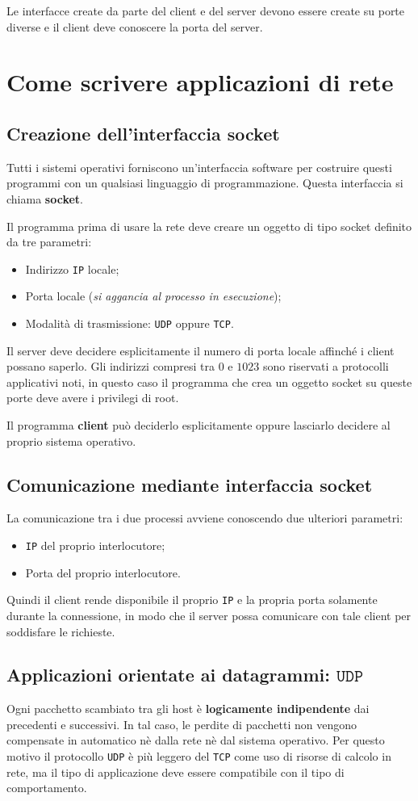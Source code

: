 \documentclass[oneside,a4paper,11pt]{book}
\theoremstyle{italicstyle}
\theoremstyle{normStyle}
\begin{document}
Le interfacce create da parte del client e del server devono essere 
create su porte diverse e il client deve conoscere la porta del server.
\section{Come scrivere applicazioni di rete}
\subsection{Creazione dell'interfaccia socket}
Tutti i sistemi operativi forniscono un'interfaccia software per 
costruire questi programmi con un qualsiasi linguaggio di programmazione.
Questa interfaccia si chiama \textbf{socket}.

Il programma prima di usare la rete deve creare un oggetto di tipo socket definito 
da tre parametri:
\begin{itemize}
  \item Indirizzo \verb|IP| locale;
  \item Porta locale (\textit{si aggancia al processo in esecuzione});
  \item Modalità di trasmissione: \verb|UDP| oppure \verb|TCP|.
\end{itemize}

Il server deve decidere esplicitamente il numero di porta locale affinché i 
client possano saperlo. Gli indirizzi compresi tra $0$ e $1023$ sono riservati 
a protocolli applicativi noti, in questo caso il programma che crea un oggetto 
socket su queste porte deve avere i privilegi di root.

Il programma \textbf{client} può deciderlo esplicitamente oppure lasciarlo decidere 
al proprio sistema operativo.
\subsection{Comunicazione mediante interfaccia socket}
La comunicazione tra i due processi avviene conoscendo due ulteriori parametri:
\begin{itemize}  
  \item \verb|IP| del proprio interlocutore;
  \item Porta del proprio interlocutore.
\end{itemize}
Quindi il client rende disponibile il proprio \verb|IP| e la propria 
porta solamente 
durante la connessione, in modo che il server possa comunicare con 
tale client per soddisfare le richieste.
\subsection{Applicazioni orientate ai datagrammi: $\texttt{UDP}$}
Ogni pacchetto scambiato tra gli host è \textbf{logicamente indipendente}
dai precedenti e successivi.
In tal caso, le perdite di pacchetti non vengono compensate in automatico 
nè dalla rete nè dal sistema operativo. Per questo motivo il protocollo \verb|UDP|
è più leggero del \verb|TCP| come uso di risorse di calcolo in rete, ma 
il tipo di applicazione deve essere compatibile con il tipo di comportamento.
\end{document}
